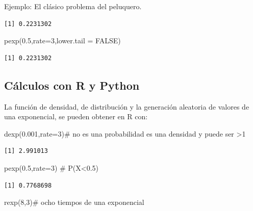 \documentclass[
  letterpaper,
  DIV=11,
  numbers=noendperiod]{scrreprt}
\newenvironment{Shaded}{\begin{snugshade}}{\end{snugshade}}
\newcommand{\AttributeTok}[1]{\textcolor[rgb]{0.40,0.45,0.13}{#1}}
\newcommand{\CommentTok}[1]{\textcolor[rgb]{0.37,0.37,0.37}{#1}}
\newcommand{\ConstantTok}[1]{\textcolor[rgb]{0.56,0.35,0.01}{#1}}
\newcommand{\DecValTok}[1]{\textcolor[rgb]{0.68,0.00,0.00}{#1}}
\newcommand{\FloatTok}[1]{\textcolor[rgb]{0.68,0.00,0.00}{#1}}
\newcommand{\FunctionTok}[1]{\textcolor[rgb]{0.28,0.35,0.67}{#1}}
\newcommand{\NormalTok}[1]{\textcolor[rgb]{0.00,0.23,0.31}{#1}}
\begin{document}
\begin{Ejemplo}{Ejemplo: El clásico problema del peluquero.}{}
\begin{verbatim}
[1] 0.2231302
\end{verbatim}

\begin{Shaded}
\begin{Highlighting}[]
\FunctionTok{pexp}\NormalTok{(}\FloatTok{0.5}\NormalTok{,}\AttributeTok{rate=}\DecValTok{3}\NormalTok{,}\AttributeTok{lower.tail =} \ConstantTok{FALSE}\NormalTok{)}
\end{Highlighting}
\end{Shaded}

\begin{verbatim}
[1] 0.2231302
\end{verbatim}

\end{Ejemplo}

\subsection{Cálculos con R y Python}\label{cuxe1lculos-con-r-y-python}

La función de densidad, de distribución y la generación aleatoria de
valores de una exponencial, se pueden obtener en R con:

\begin{Shaded}
\begin{Highlighting}[]
\FunctionTok{dexp}\NormalTok{(}\FloatTok{0.001}\NormalTok{,}\AttributeTok{rate=}\DecValTok{3}\NormalTok{)}\CommentTok{\# no es una probabilidad es una densidad y puede ser \textgreater{}1}
\end{Highlighting}
\end{Shaded}

\begin{verbatim}
[1] 2.991013
\end{verbatim}

\begin{Shaded}
\begin{Highlighting}[]
\FunctionTok{pexp}\NormalTok{(}\FloatTok{0.5}\NormalTok{,}\AttributeTok{rate=}\DecValTok{3}\NormalTok{) }\CommentTok{\# P(X\textless{}0.5)}
\end{Highlighting}
\end{Shaded}

\begin{verbatim}
[1] 0.7768698
\end{verbatim}

\begin{Shaded}
\begin{Highlighting}[]
\FunctionTok{rexp}\NormalTok{(}\DecValTok{8}\NormalTok{,}\DecValTok{3}\NormalTok{)}\CommentTok{\# ocho tiempos de una exponencial}
\end{Highlighting}
\end{Shaded}
\end{document}

